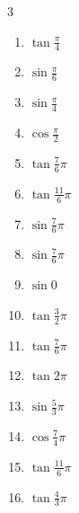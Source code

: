 \begin{multicols}{3}
\begin{enumerate}
  \item $\displaystyle \tan{\frac{\pi}{4}}$
        \phantom{$\displaystyle =1$}

  \item $\displaystyle \sin{\frac{\pi}{6}}$

  \item $\displaystyle \sin{\frac{\pi}{4}}$

  \item $\displaystyle \cos{\frac{\pi}{2}}$
        \phantom{$\displaystyle =0$}

  \item $\displaystyle \tan{\frac{7}{6}\pi}$

  \item $\displaystyle \tan{\frac{11}{6}\pi}$

  \item $\displaystyle \sin{\frac{7}{6}\pi}$

  \item $\displaystyle \sin{\frac{7}{6}\pi}$

  \item $\displaystyle \sin{0}$
        \phantom{$\displaystyle =0$}

  \item $\displaystyle \tan{\frac{3}{2}\pi}$
        \phantom{$\displaystyle \quad なし$}

  \item $\displaystyle \tan{\frac{7}{6}\pi}$

  \item $\displaystyle \tan{2\pi}$
        \phantom{$\displaystyle =0$}

  \item $\displaystyle \sin{\frac{5}{3}\pi}$

  \item $\displaystyle \cos{\frac{7}{4}\pi}$

  \item $\displaystyle \tan{\frac{11}{6}\pi}$

  \item $\displaystyle \tan{\frac{4}{3}\pi}$


\end{enumerate}
\end{multicols}
